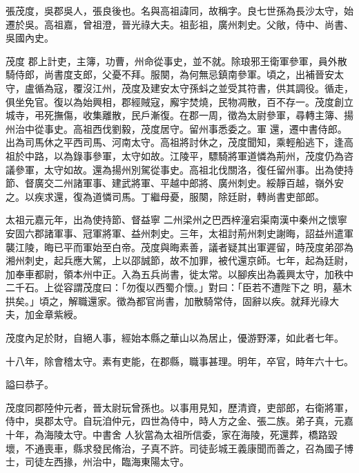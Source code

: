 
\begin{pinyinscope}

 張茂度，吳郡吳人，張良後也。名與高祖諱同，故稱字。良七世孫為長沙太守，始遷於吳。高祖嘉，曾祖澄，晉光祿大夫。祖彭祖，廣州刺史。父敞，侍中、尚書、吳國內史。



 茂度
 郡上計吏，主簿，功曹，州命從事史，並不就。除琅邪王衛軍參軍，員外散騎侍郎，尚書度支郎，父憂不拜。服闋，為何無忌鎮南參軍。頃之，出補晉安太守，盧循為寇，覆沒江州，茂度及建安太守孫蚪之並受其符書，供其調役。循走，俱坐免官。復以為始興相，郡經賊寇，廨宇焚燒，民物凋散，百不存一。茂度創立城寺，弔死撫傷，收集離散，民戶漸復。在郡一周，徵為太尉參軍，尋轉主簿、揚州治中從事史。高祖西伐劉毅，茂度居守。留州事悉委之。軍
 還，遷中書侍郎。出為司馬休之平西司馬、河南太守。高祖將討休之，茂度聞知，乘輕船逃下，逢高祖於中路，以為錄事參軍，太守如故。江陵平，驃騎將軍道憐為荊州，茂度仍為咨議參軍，太守如故。還為揚州別駕從事史。高祖北伐關洛，復任留州事。出為使持節、督廣交二州諸軍事、建武將軍、平越中郎將、廣州刺史。綏靜百越，嶺外安之。以疾求還，復為道憐司馬。丁繼母憂，服闋，除廷尉，轉尚書吏部郎。



 太祖元嘉元年，出為使持節、督益寧
 二州梁州之巴西梓潼宕渠南漢中秦州之懷寧安固六郡諸軍事、冠軍將軍、益州刺史。三年，太祖討荊州刺史謝晦，詔益州遣軍襲江陵，晦已平而軍始至白帝。茂度與晦素善，議者疑其出軍遲留，時茂度弟邵為湘州刺史，起兵應大駕，上以邵誠節，故不加罪，被代還京師。七年，起為廷尉，加奉車都尉，領本州中正。入為五兵尚書，徙太常。以腳疾出為義興太守，加秩中二千石。上從容謂茂度曰：「勿復以西蜀介懷。」對曰：「臣若不遭陛下之
 明，墓木拱矣。」頃之，解職還家。徵為都官尚書，加散騎常侍，固辭以疾。就拜光祿大夫，加金章紫綬。



 茂度內足於財，自絕人事，經始本縣之華山以為居止，優游野澤，如此者七年。



 十八年，除會稽太守。素有吏能，在郡縣，職事甚理。明年，卒官，時年六十七。



 謚曰恭子。



 茂度同郡陸仲元者，晉太尉玩曾孫也。以事用見知，歷清資，吏部郎，右衛將軍，侍中，吳郡太守。自玩洎仲元，四世為侍中，時人方之金、張二族。弟子真，元嘉十年，為海陵太守。中書舍
 人狄當為太祖所信委，家在海陵，死還葬，橋路毀壞，不通喪車，縣求發民脩治，子真不許。司徒彭城王義康聞而善之，召為國子博士，司徒左西掾，州治中，臨海東陽太守。




\end{pinyinscope}
